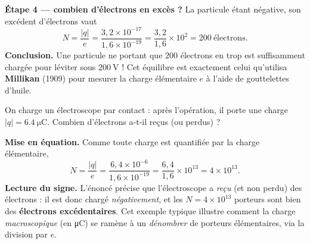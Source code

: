 \documentclass[11pt,a4paper]{article}
\begin{document}
\begin{exemple}
\textbf{Étape 4 — combien d'électrons en excès ?} La particule étant négative, son excédent
d'électrons vaut
\[ N = \frac{|q|}{e} = \frac{3{,}2\times 10^{-17}}{1{,}6\times 10^{-19}} = \frac{3{,}2}{1{,}6}\times 10^{2}
   = \boxed{200\ \text{électrons}}. \]
\textbf{Conclusion.} Une particule ne portant que $200$ électrons en trop est suffisamment chargée
pour léviter sous $\SI{200}{\volt}$ ! Cet équilibre est exactement celui qu'utilisa
\textbf{Millikan} (1909) pour mesurer la charge élémentaire $e$ à l'aide de gouttelettes d'huile.
\end{exemple}

\begin{exemple}
On charge un électroscope par contact : après l'opération, il porte une charge $|q| =
\SI{6.4}{\micro\coulomb}$. Combien d'électrons a-t-il reçus (ou perdus) ?

\textbf{Mise en équation.} Comme toute charge est quantifiée par la charge élémentaire,
\[ N = \frac{|q|}{e} = \frac{6{,}4\times 10^{-6}}{1{,}6\times 10^{-19}}
   = \frac{6{,}4}{1{,}6}\times 10^{13} = 4\times 10^{13}. \]
\textbf{Lecture du signe.} L'énoncé précise que l'électroscope a \emph{reçu} (et non perdu) des
électrons : il est donc chargé \emph{négativement}, et les $N=4\times 10^{13}$ porteurs sont bien
des \textbf{électrons excédentaires}. Cet exemple typique illustre comment la charge
\emph{macroscopique} (en \si{\micro\coulomb}) se ramène à un \emph{dénombrer} de porteurs
élémentaires, via la division par $e$.
\end{exemple}
\end{document}
